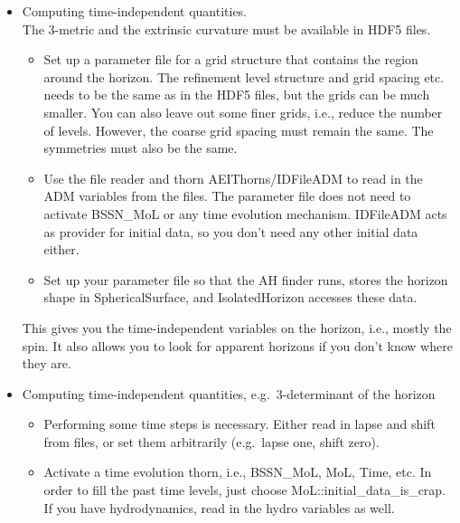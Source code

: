 \begin{itemize}

\item

Computing time-independent quantities.\\

The 3-metric and the extrinsic curvature must be available in HDF5
files.

\begin{itemize}

\item Set up a parameter file for a grid structure that contains the
  region around the horizon.  The refinement level structure and grid
  spacing etc. needs to be the same as in the HDF5 files, but the
  grids can be much smaller.  You can also leave out some finer grids,
  i.e., reduce the number of levels.  However, the coarse grid spacing
  must remain the same.  The symmetries must also be the same.

\item Use the file reader and thorn AEIThorns/IDFileADM to read in the
  ADM variables from the files.  The parameter file does not need to
  activate BSSN\_MoL or any time evolution mechanism.  IDFileADM acts
  as provider for initial data, so you don't need any other initial
  data either.

\item Set up your parameter file so that the AH finder runs, stores
  the horizon shape in SphericalSurface,
  and IsolatedHorizon accesses these data.\\

\end{itemize}

This gives you the time-independent variables on the horizon, i.e.,
mostly the spin.  It also allows you to look for apparent horizons if
you don't know where they are.


\item
  Computing time-independent quantities, e.g.\ 3-determinant of the horizon\\

\begin{itemize}

\item Performing some time steps is necessary. Either read in lapse
  and shift from files, or set them arbitrarily (e.g.\ lapse one,
  shift zero).

\item Activate a time evolution thorn, i.e., BSSN\_MoL, MoL, Time,
  etc.  In order to fill the past time levels, just choose
  MoL::initial\_data\_is\_crap.  If you have hydrodynamics, read in
  the hydro variables as well.


\end{itemize}
\end{itemize}
